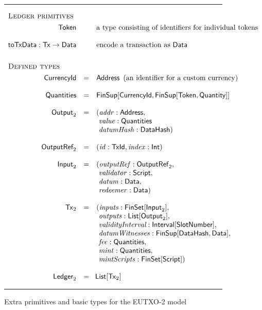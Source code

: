 \documentclass[a4paper]{article}
\renewcommand{\i}{\textit}  %
\newcommand{\s}{\textsf}  %
\newcommand{\msf}[1]{\ensuremath{\mathsf{#1}}}
\newcommand{\mi}[1]{\ensuremath{\mathit{#1}}}
\newcommand\rfskip{7pt}
\newenvironment{ruledfigure}[1]{\begin{figure}[#1]\hrule\vspace{\rfskip}}{\vspace{\rfskip}\hrule\end{figure}}
\newcommand{\List}[1]{\ensuremath{\s{List}[#1]}}
\newcommand{\FinSet}[1]{\ensuremath{\s{FinSet}[#1]}}
\newcommand{\Interval}[1]{\ensuremath{\s{Interval}[#1]}}
\newcommand{\FinSup}[2]{\ensuremath{\s{FinSup}[#1,#2]}}
\newcommand{\script}{\ensuremath{\s{Script}}}
\newcommand{\toTxData}{\ensuremath{\s{toTxData}}}
\newcommand{\TxId}{\ensuremath{\s{TxId}}}
\newcommand{\txrefid}{\mi{id}}
\newcommand{\Address}{\ensuremath{\s{Address}}}
\newcommand{\DataHash}{\ensuremath{\s{DataHash}}}
\newcommand{\idx}{\mi{index}}
\newcommand{\inputs}{\mi{inputs}}
\newcommand{\outputs}{\mi{outputs}}
\newcommand{\mint}{\mi{mint}}
\newcommand{\mintScripts}{\mi{mintScripts}}
\newcommand{\fee}{\mi{fee}}
\newcommand{\addr}{\mi{addr}}
\newcommand{\val}{\mi{value}}  %
\newcommand{\validator}{\mi{validator}}
\newcommand{\redeemer}{\mi{redeemer}}
\newcommand{\datum}{\mi{datum}}
\newcommand{\datumHash}{\mi{datumHash}}
\newcommand{\datumWits}{\mi{datumWitnesses}}
\newcommand{\Data}{\ensuremath{\s{Data}}}
\newcommand{\outputref}{\mi{outputRef}}
\newcommand{\slotnum}{\ensuremath{\s{SlotNumber}}}
\newcommand{\eutxotx}{\msf{Tx}}
\newcommand{\qty}{\ensuremath{\s{Quantity}}}
\newcommand{\token}{\ensuremath{\s{Token}}}
\newcommand{\currency}{\ensuremath{\s{CurrencyId}}}
\newcommand{\qtymap}{\ensuremath{\s{Quantities}}}
\begin{document}
\begin{ruledfigure}{H}
  \begin{displaymath}
    \begin{array}{rll}
      \multicolumn{3}{l}{\textsc{Ledger primitives}}\\[4pt]
    \token     && \mbox{a type consisting of identifiers for individual tokens}\\
    \\
     \toTxData : \eutxotx \rightarrow \Data &~& \mbox{encode a transaction as $\Data$}
     \\
     \medskip
     \\
     \multicolumn{3}{l}{\textsc{Defined types}}\\[4pt]
    \currency  &=& \Address \enspace\mbox{(an identifier for a custom currency)}\\
    \\
    \qtymap   &=& \FinSup{\currency}{\FinSup{\token}{\qty}}\\
    \\
    \s{Output}_2 &=&(\addr: \Address,\\
                 & &\ \val: \qtymap\\
                 & &\ \datumHash: \DataHash)\\
    \\
    \s{OutputRef}_2 &= &(\txrefid: \TxId, \idx: \s{Int})\\
    \\
    \s{Input}_2 &=&( \outputref: \sf{OutputRef}_2,\\
                & &\ \validator: \script,\\
                & &\ \datum: \Data,\\
                & &\ \redeemer: \Data)\\
    \\
    \eutxotx_2 &=&(\inputs: \FinSet{\s{Input}_2},\\
               & &\ \outputs: \List{\s{Output}_2},\\
               & &\ \i{validityInterval}: \Interval{\slotnum},\\
               & &\ \datumWits: \FinSup{\DataHash}{\Data},\\
               & &\ \fee: \qtymap,\\
               & &\ \mint: \qtymap,\\
               & &\ \mintScripts: \FinSet{\script})\\
    \\
    \s{Ledger}_2 &=&\!\List{\eutxotx_2}\\
    \end{array}
  \end{displaymath}
  \caption{Extra primitives and basic types for the EUTXO-2 model}
  \label{fig:eutxo-2-types}
\end{ruledfigure}
\end{document}
